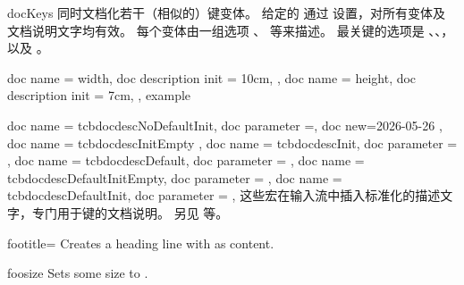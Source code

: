 \begin{docEnvironment}[doclang/environment content=key description,doc new=2020-04-22]
    {docKeys}{}
  同时文档化若干（相似的）键变体。
  给定的  通过  设置，对所有变体及文档说明文字均有效。
  每个变体由一组选项 、 等来描述。
  最关键的选项是
  、、，
  以及 。
\begin{dispExample}
\begin{docKeys}[
    doc no index,   %
    doc keypath           = mykeyroot,
    doc parameter eq meta = length,
  ]
  {
    {
      doc name             = width,
      doc description init = 10cm,
    },
    {
      doc name             = height,
      doc description init = 7cm,
    },
  }
  example
\end{docKeys}
\end{dispExample}
\end{docEnvironment}


\clearpage
\begin{docCommands}
  {
    { doc name = tcbdocdescNoDefaultInit, doc parameter =, doc new=2026-05-26 },
    { doc name = tcbdocdescInitEmpty },
    { doc name = tcbdocdescInit, doc parameter =  },
    { doc name = tcbdocdescDefault, doc parameter =  },
    { doc name = tcbdocdescDefaultInitEmpty, doc parameter =  },
    { doc name = tcbdocdescDefaultInit, doc parameter =  },
  }
这些宏在输入流中插入标准化的描述文字，专门用于键的文档说明。
另见  等。

\begin{dispExample}
\tcbdocdescNoDefaultInit       \par
\tcbdocdescInitEmpty           \par
{}             \par
{}          \par
{} \par
{}

\begin{docKey}[foo]{footitle}{=}{\tcbdocdescInitEmpty}
  Creates a heading line with  as content.
\end{docKey}

\begin{docKey}[foo]{foosize}{}{\tcbdocdescDefaultInit{10cm}{3cm}}
  Sets some size to .
\end{docKey}
\end{dispExample}
\end{docCommands}


